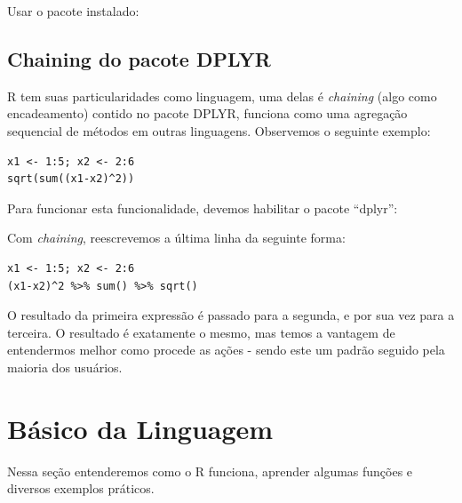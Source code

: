 \documentclass[a4paper,11pt]{article}
\begin{document}
Usar o pacote instalado: \\

\subsection{Chaining do pacote DPLYR}
R tem suas particularidades como linguagem, uma delas é \textit{chaining} (algo como encadeamento) contido no pacote DPLYR, funciona como uma agregação sequencial de métodos em outras linguagens. Observemos o seguinte exemplo:
\begin{lstlisting}
x1 <- 1:5; x2 <- 2:6
sqrt(sum((x1-x2)^2))
\end{lstlisting}

\begin{theo}[]{}
	Para funcionar esta funcionalidade, devemos habilitar o pacote ``dplyr'': \\
\end{theo}

Com \textit{chaining}, reescrevemos a última linha da seguinte forma:
\begin{lstlisting}
x1 <- 1:5; x2 <- 2:6
(x1-x2)^2 %>% sum() %>% sqrt()
\end{lstlisting}

O resultado da primeira expressão é passado para a segunda, e por sua vez para a terceira. O resultado é exatamente o mesmo, mas temos a vantagem de entendermos melhor como procede as ações - sendo este um padrão seguido pela maioria dos usuários.

\section{Básico da Linguagem}
Nessa seção entenderemos como o R funciona, aprender algumas funções e diversos exemplos práticos.
\end{document}
